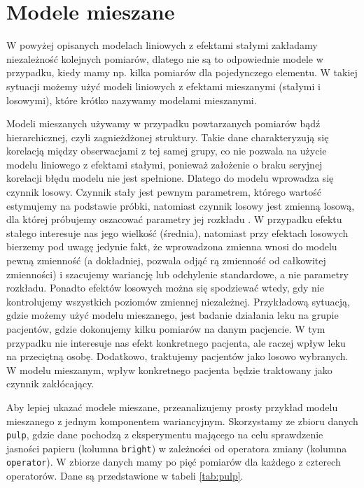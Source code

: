 \documentclass[12pt]{mwbk}
\theoremstyle{plain}
\theoremstyle{definition}
\theoremstyle{remark}
\begin{document}
\section{Modele mieszane} 
W powyżej opisanych modelach liniowych z efektami stałymi zakładamy niezależność kolejnych pomiarów, dlatego nie są to odpowiednie modele w przypadku, kiedy mamy np. kilka pomiarów dla pojedynczego elementu. W takiej sytuacji możemy użyć modeli liniowych z efektami mieszanymi (stałymi i losowymi), które krótko nazywamy modelami mieszanymi.

Modeli mieszanych używamy w przypadku powtarzanych pomiarów bądź hierarchicznej, czyli zagnieżdżonej struktury. Takie dane charakteryzują się korelacją między obserwacjami z tej samej grupy, co nie pozwala na użycie modelu liniowego z efektami stałymi, ponieważ założenie o braku seryjnej korelacji błędu modelu nie jest spełnione. Dlatego do modelu wprowadza się czynnik losowy.  Czynnik stały jest pewnym parametrem, którego wartość estymujemy na podstawie próbki, natomiast czynnik losowy jest zmienną losową, dla której próbujemy oszacować parametry jej rozkładu \cite{faraway}. W przypadku efektu stałego interesuje nas jego wielkość (średnia), natomiast przy efektach losowych bierzemy pod uwagę jedynie fakt, że wprowadzona zmienna wnosi do modelu pewną zmienność (a dokładniej, pozwala odjąć rą zmienność od całkowitej zmienności) i szacujemy wariancję lub odchylenie standardowe, a nie parametry rozkładu. Ponadto efektów losowych można się spodziewać wtedy, gdy nie kontrolujemy wszystkich poziomów zmiennej niezależnej. Przykładową sytuacją, gdzie możemy użyć modelu mieszanego, jest badanie działania leku na grupie pacjentów, gdzie dokonujemy kilku pomiarów na danym pacjencie. W tym przypadku nie interesuje nas efekt konkretnego pacjenta, ale raczej wpływ leku na przeciętną osobę. Dodatkowo, traktujemy pacjentów jako losowo wybranych. W modelu mieszanym, wpływ konkretnego pacjenta będzie traktowany jako czynnik zakłócający.








Aby lepiej ukazać modele mieszane, przeanalizujemy prosty przykład modelu mieszanego z jednym komponentem wariancyjnym. Skorzystamy ze zbioru danych \texttt{pulp}, gdzie dane pochodzą z eksperymentu mającego na celu sprawdzenie jasności papieru (kolumna \texttt{bright}) w zależności od operatora zmiany (kolumna \texttt{operator}). W zbiorze danych mamy po pięć pomiarów dla każdego z czterech operatorów. Dane są przedstawione w tabeli \ref{tab:pulp}.
\end{document}
